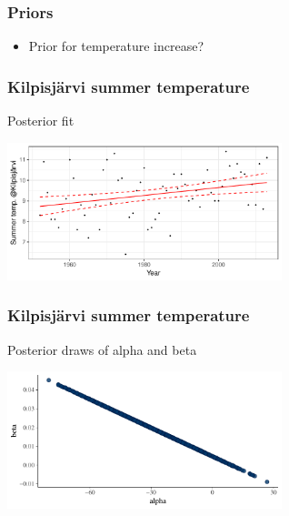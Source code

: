 \documentclass[10pt]{beamer}
\begin{document}
\begin{frame}

\frametitle{Priors}

  \begin{itemize}
  \item Prior for temperature increase?
  \end{itemize}

\end{frame}

\begin{frame}

\frametitle{Kilpisjärvi summer temperature}

  Posterior fit

  \begin{center}
    \includegraphics[width=8cm]{figs/kilpis_lin_pfit.pdf}
  \end{center}

\end{frame}

\begin{frame}[fragile]

\frametitle{Kilpisjärvi summer temperature}

  Posterior draws of alpha and beta

  \begin{center}
    \includegraphics[width=8cm]{figs/kilpis_lin_mcmc_scatter.pdf}
  \end{center}

\end{frame}
\end{document}

